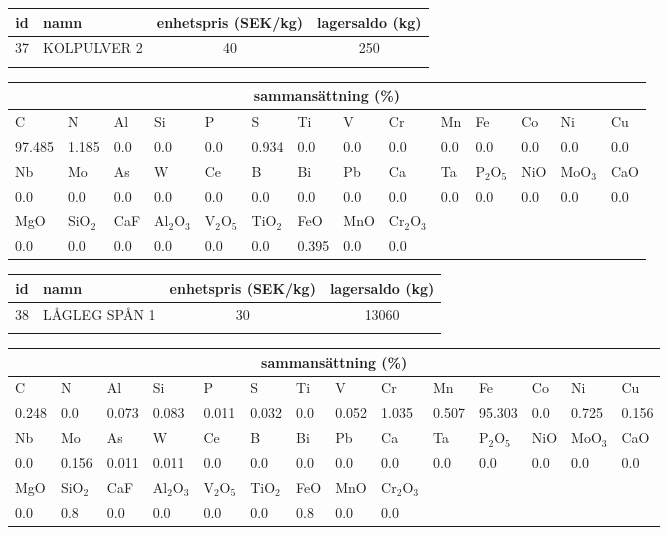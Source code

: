 \begin{center}
{\scriptsize\addtolength{\tabcolsep}{-3pt}
\begin{tabular}{clcc}
id&namn&enhetspris (SEK/kg)&lagersaldo (kg)\\
\hline
37&KOLPULVER 2&40&250\\\\
\end{tabular}
\begin{tabular}{llllllllllllll}
\multicolumn{14}{c}{sammansättning (\%)}\\
\hline
C&N&Al&Si&P&S&Ti&V&Cr&Mn&Fe&Co&Ni&Cu\\
\hline
97.485&1.185&0.0&0.0& 0.0&0.934&0.0&0.0& 0.0&0.0&0.0&0.0& 0.0&0.0\\
\hline
Nb&Mo&As&W&Ce&B&Bi&Pb&Ca&Ta&P$_2$O$_5$&NiO&MoO$_3$&CaO\\
\hline
0.0& 0.0& 0.0& 0.0& 0.0& 0.0& 0.0& 0.0& 0.0& 0.0& 0.0& 0.0& 0.0& 0.0\\
\hline
MgO&SiO$_2$&CaF&Al$_2$O$_3$&V$_2$O$_5$&TiO$_2$&FeO&MnO&Cr$_2$O$_3$\\
\hline
0.0& 0.0& 0.0& 0.0& 0.0& 0.0& 0.395& 0.0& 0.0\\
\end{tabular}
}
\end{center}

\begin{center}
{\scriptsize\addtolength{\tabcolsep}{-3pt}
\begin{tabular}{clcc}
id&namn&enhetspris (SEK/kg)&lagersaldo (kg)\\
\hline
38&LÅGLEG SPÅN 1&30&13060\\\\
\end{tabular}
\begin{tabular}{llllllllllllll}
\multicolumn{14}{c}{sammansättning (\%)}\\
\hline
C&N&Al&Si&P&S&Ti&V&Cr&Mn&Fe&Co&Ni&Cu\\
\hline
0.248&0.0&0.073&0.083& 0.011&0.032&0.0&0.052& 1.035&0.507&95.303&0.0& 0.725&0.156\\
\hline
Nb&Mo&As&W&Ce&B&Bi&Pb&Ca&Ta&P$_2$O$_5$&NiO&MoO$_3$&CaO\\
\hline
0.0& 0.156& 0.011& 0.011& 0.0& 0.0& 0.0& 0.0& 0.0& 0.0& 0.0& 0.0& 0.0& 0.0\\
\hline
MgO&SiO$_2$&CaF&Al$_2$O$_3$&V$_2$O$_5$&TiO$_2$&FeO&MnO&Cr$_2$O$_3$\\
\hline
0.0& 0.8& 0.0& 0.0& 0.0& 0.0& 0.8& 0.0& 0.0\\
\end{tabular}
}
\end{center}


